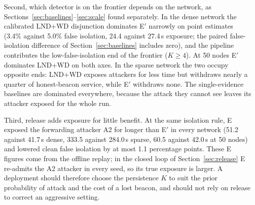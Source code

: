 Second, which detector is on the frontier depends on the network, as
Sections~\ref{sec:baselines}--\ref{sec:scale} found separately. In the dense
network the calibrated LND+WD disjunction dominates E$'$ narrowly on point
estimates (3.4\% against 5.0\% false isolation, 24.4 against 27.4\,s
exposure; the paired false-isolation difference of Section~\ref{sec:baselines}
includes zero), and the
pipeline contributes the low-false-isolation end of the frontier ($K \ge 4$).
At 50 nodes E$'$ dominates LND+WD on both axes. In the sparse network the two
occupy opposite ends: LND+WD exposes attackers for less time but withdraws
nearly a quarter of honest-beacon service, while E$'$ withdraws none. The
single-evidence baselines are dominated everywhere, because the attack they
cannot see leaves its attacker exposed for the whole run.

Third, release adds exposure for little benefit. At the same isolation rule,
E exposed the forwarding attacker A2 for longer than E$'$ in every network
(51.2 against 41.7\,s dense, 333.5 against 284.0\,s sparse, 60.5 against
42.0\,s at 50 nodes) and lowered clean false isolation by at most 1.1
percentage points. These E figures come from the offline replay; in the closed
loop of Section~\ref{sec:release} E re-admits the A2 attacker in every seed,
so its true exposure is larger. A deployment should therefore choose the
persistence $K$ to suit the prior probability of attack and the cost of a lost
beacon, and should not rely on release to correct an aggressive setting.
